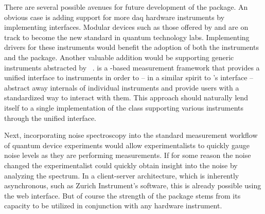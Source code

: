 There are several possible avenues for future development of the \pyspeck package.
An obvious case is adding support for more \gls{daq} hardware instruments by implementing  interfaces.
Modular devices such as those offered by  and  are on track to become the new standard in quantum technology labs.
Implementing drivers for these instruments would benefit the adoption of both the instruments and the \pyspeck package.
Another valuable addition would be supporting generic instruments abstracted by \qumada~\cite{Huckemann2025}.
\qumada is a \qcodes-based measurement framework that provides a unified interface to instruments in order to -- in a similar spirit to \pyspeck's  interface -- abstract away internals of individual instruments and provide users with a standardized way to interact with them.
This approach should naturally lend itself to a single implementation of the  class supporting various instruments through the unified \qumada interface.

Next, incorporating noise spectroscopy into the standard measurement workflow of quantum device experiments would allow experimentalists to quickly gauge noise levels as they are performing measurements.
If for some reason the noise changed
the experimentalist could quickly obtain insight into the noise by analyzing the spectrum.
In a client-server architecture, which is inherently asynchronous, such as Zurich Instrument's  software, this is already possible using the web interface.
But of course the strength of the \pyspeck package stems from its capacity to be utilized in conjunction with any hardware instrument.

